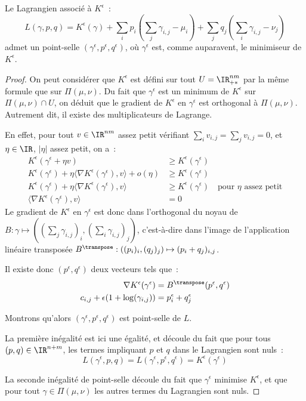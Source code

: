 \begin{lemma}\label{lemma:pt_selle}
Le Lagrangien associé à $K^\epsilon$~:
\[
L(\gamma, p, q) = K^\epsilon(\gamma) +
 \sum_i p_i \left(\sum_j \gamma_{i,j} - \mu_i\right) + 
 \sum_j q_j\left(\sum_i \gamma_{i,j} - \nu_j\right)
\]
admet un point-selle $(\gamma^\epsilon,p^\epsilon,q^\epsilon)$, où $\gamma^\epsilon$ est, comme auparavent, le minimiseur de $K^\epsilon$.
\end{lemma}
\begin{proof}
On peut considérer que $K^\epsilon$ est défini sur tout $U = \IR_{+*}^{nm}$ par la même formule que sur $\Pi(\mu,\nu)$. Du fait que $\gamma^\epsilon$ est un minimum de $K^\epsilon$ sur $\Pi(\mu,\nu) \cap U$, on déduit que le gradient de $K^\epsilon$ en $\gamma^\epsilon$ est orthogonal à $\Pi(\mu,\nu)$. Autrement dit, il existe des multiplicateurs de Lagrange.

En effet, pour tout $v \in \IR^{nm}$ assez petit vérifiant $\sum_i v_{i,j} = \sum_j v_{i,j} = 0$, et $\eta \in \IR$, $|\eta|$ assez petit, on a~:
\[ \begin{split}
K^\epsilon(\gamma^\epsilon + \eta v) &\ge K^\epsilon(\gamma^\epsilon) \\
K^\epsilon(\gamma^\epsilon) + \eta \langle \nabla K^\epsilon(\gamma^\epsilon) , v \rangle + o(\eta)  &\ge K^\epsilon(\gamma^\epsilon) \\
K^\epsilon(\gamma^\epsilon) + \eta \langle \nabla K^\epsilon(\gamma^\epsilon) , v \rangle &\ge K^\epsilon(\gamma^\epsilon) \quad \text{pour $\eta$ assez petit} \\
\langle \nabla K^\epsilon(\gamma^\epsilon) , v \rangle &= 0
\end{split}\]
Le gradient de $K^\epsilon$ en $\gamma^\epsilon$ est donc dans l'orthogonal du noyau de $B : \gamma \mapsto ((\sum_j \gamma_{i,j})_i, (\sum_i \gamma_{i,j})_j)$, c'est-à-dire dans l'image de l'application linéaire transposée $B^\transpose : ((p_i)_i,(q_j)_j) \mapsto (p_i+q_j)_{i,j}$.

Il existe donc $(p^\epsilon,q^\epsilon)$ deux vecteurs tels que~:
\[\begin{split}
\nabla K^\epsilon(\gamma^\epsilon) &= B^\transpose (p^\epsilon,q^\epsilon)  \\
c_{i,j} + \epsilon (1+\log(\gamma_{i,j})) &= p^\epsilon_i + q^\epsilon_j
\end{split}\]

Montrons qu'alors $(\gamma^\epsilon,p^\epsilon,q^\epsilon)$ est point-selle de $L$.

La première inégalité est ici une égalité, et découle du fait que pour tous $(p,q) \in \IR^{n+m}$, les termes impliquant $p$ et $q$ dans le Lagrangien sont nuls~:
\[ L(\gamma^\epsilon,p,q) = L(\gamma^\epsilon,p^\epsilon,q^\epsilon) = K^\epsilon(\gamma^\epsilon) \]

La seconde inégalité de point-selle découle du fait que $\gamma^\epsilon$ minimise $K^\epsilon$, et que pour tout $\gamma \in \Pi(\mu,\nu)$ les autres termes du Lagrangien sont nuls.
\end{proof}


